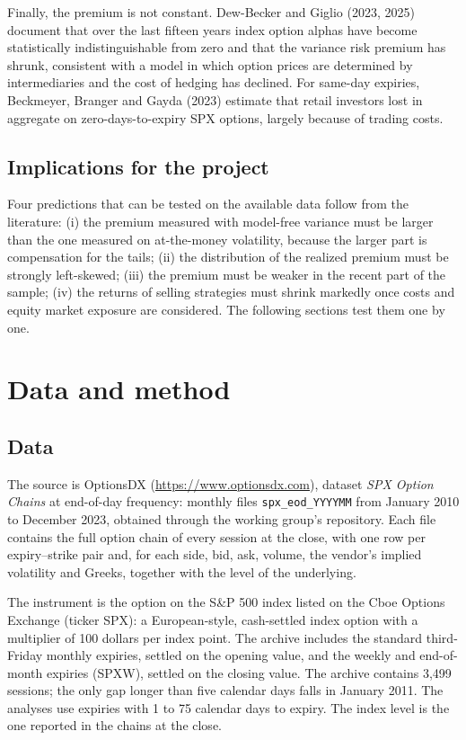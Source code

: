 \documentclass[11pt,a4paper]{article}
\begin{document}
Finally, the premium is not constant. Dew-Becker and Giglio (2023, 2025) document that over the last fifteen years index option alphas have become statistically indistinguishable from zero and that the variance risk premium has shrunk, consistent with a model in which option prices are determined by intermediaries and the cost of hedging has declined. For same-day expiries, Beckmeyer, Branger and Gayda (2023) estimate that retail investors lost in aggregate on zero-days-to-expiry SPX options, largely because of trading costs.

\subsection{Implications for the project}

Four predictions that can be tested on the available data follow from the literature: (i) the premium measured with model-free variance must be larger than the one measured on at-the-money volatility, because the larger part is compensation for the tails; (ii) the distribution of the realized premium must be strongly left-skewed; (iii) the premium must be weaker in the recent part of the sample; (iv) the returns of selling strategies must shrink markedly once costs and equity market exposure are considered. The following sections test them one by one.

\section{Data and method}\label{sec:dati}

\subsection{Data}

The source is OptionsDX (\url{https://www.optionsdx.com}), dataset \emph{SPX Option Chains} at end-of-day frequency: monthly files \texttt{spx\_eod\_YYYYMM} from January 2010 to December 2023, obtained through the working group's repository. Each file contains the full option chain of every session at the close, with one row per expiry--strike pair and, for each side, bid, ask, volume, the vendor's implied volatility and Greeks, together with the level of the underlying.

The instrument is the option on the S\&P 500 index listed on the Cboe Options Exchange (ticker SPX): a European-style, cash-settled index option with a multiplier of 100 dollars per index point. The archive includes the standard third-Friday monthly expiries, settled on the opening value, and the weekly and end-of-month expiries (SPXW), settled on the closing value. The archive contains 3,499 sessions; the only gap longer than five calendar days falls in January 2011. The analyses use expiries with 1 to 75 calendar days to expiry. The index level is the one reported in the chains at the close.
\end{document}
